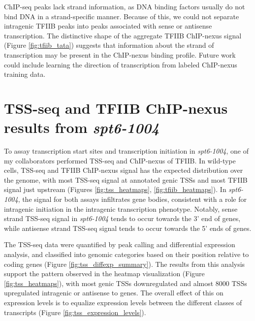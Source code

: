 ChIP-seq peaks lack strand information, as DNA binding factors usually do not bind DNA in a strand-specific manner.
Because of this, we could not separate intragenic TFIIB peaks into peaks associated with sense or antisense transcription.
The distinctive shape of the aggregate TFIIB ChIP-nexus signal (Figure \ref{fig:tfiib_tata}) suggests that information about the strand of transcription may be present in the ChIP-nexus binding profile.
Future work could include learning the direction of transcription from labeled ChIP-nexus training data.

\section{TSS-seq and TFIIB ChIP-nexus results from \textit{spt6-1004}}

To assay transcription start sites and transcription initiation in \textit{spt6-1004}, one of my collaborators performed TSS-seq and ChIP-nexus of TFIIB.
In wild-type cells, TSS-seq and TFIIB ChIP-nexus signal has the expected distribution over the genome, with most TSS-seq signal at annotated genic TSSs and most TFIIB signal just upstream (Figures \ref{fig:tss_heatmaps}, \ref{fig:tfiib_heatmaps}).
In \textit{spt6-1004}, the signal for both assays infiltrates gene bodies, consistent with a role for intragenic initiation in the intragenic transcription phenotype.
Notably, sense strand TSS-seq signal in \textit{spt6-1004} tends to occur towards the 3' end of genes, while antisense strand TSS-seq signal tends to occur towards the 5' ends of genes.

The TSS-seq data were quantified by peak calling and differential expression analysis, and classified into genomic categories based on their position relative to coding genes (Figure \ref{fig:tss_diffexp_summary}).
The results from this analysis support the pattern observed in the heatmap visualization (Figure \ref{fig:tss_heatmaps}), with most genic TSSs downregulated and almost 8000 TSSs upregulated intragenic or antisense to genes.
The overall effect of this on expression levels is to equalize expression levels between the different classes of transcripts (Figure \ref{fig:tss_expression_levels}).

\newpage

\begingroup
\singlespacing

\endgroup
